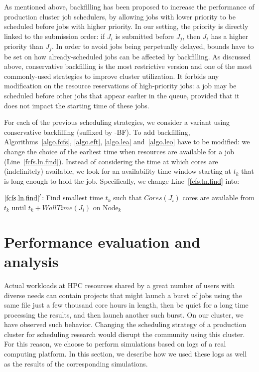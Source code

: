 \documentclass[conference]{IEEEtran}
\newcommand{\Node}[1]{\ensuremath{\mathrm{Node}_{#1}}\xspace}
\newcommand{\core}{\mathit{Cores}\xspace}
\newcommand{\walltime}{\mathit{WallTime}\xspace}
\begin{document}
As mentioned above, backfilling has been proposed to increase the
performance of production cluster job schedulers, by allowing jobs with lower priority to be
scheduled before jobs with higher priority. In our setting, the
priority is directly linked to the submission order: if $J_i$ is
submitted before $J_j$, then $J_i$ has a higher priority than $J_j$.
In order to avoid jobs
being perpetually delayed, bounds have to be set on how already-scheduled
jobs can be affected by backfilling. As discussed above,
conservative backfilling is the most restrictive version and one of
the most commonly-used strategies to improve cluster utilization. It
forbids any modification on the resource
reservations of high-priority jobs: a job may be scheduled
before other jobs that appear earlier in the queue, provided that it
does not impact the starting time of these jobs.


For each of the previous scheduling strategies, we consider a variant
using conservative backfilling (suffixed by -BF). To add
backfilling, Algorithms~\ref{algo.fcfs}, \ref{algo.eft},
\ref{algo.lea} and~\ref{algo.leo} have to be modified: we change the
choice of the earliest time when resources are available for a job
(Line~\ref{fcfs.ln.find}). Instead of considering the time at which
cores are (indefinitely) available, we look for an availability time
window starting at $t_k$ that is long enough to hold the
job. Specifically, we change Line~\ref{fcfs.ln.find} into:
\begin{algorithmic}[0]
  \State $\ref{fcfs.ln.find}'$: Find smallest time $t_k$ such that $\core(J_i)$ cores are
  available from $t_k$ until $t_k + \walltime(J_i)$ on $\Node{k}$
\end{algorithmic}


\section{Performance evaluation and analysis}\label{sec.evaluations}

Actual workloads at HPC resources shared by a great number of users with diverse needs can contain 
projects that might launch a burst of jobs using the same file just a few thousand
core hours in length, then be quiet for a long time processing the results, and then launch another such burst.
On our cluster, we have observed such behavior. %
Changing the scheduling strategy of a production cluster for
scheduling research would disrupt the community using this cluster.
For this reason, we choose to perform simulations based on logs of a
real computing platform. In this section, we describe how we used
these logs as well as the results of the corresponding simulations.
\end{document}
